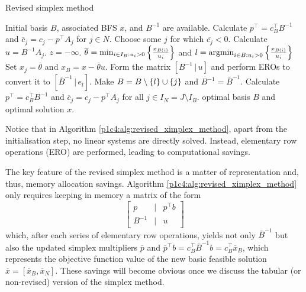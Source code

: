 \begin{algorithm}[h]
	\caption{Revised simplex method} \label{p1c4:alg:revised_ximplex_method}
	\begin{algorithmic}[1] %
	 Initial basis $B$, associated BFS $x$, and $B^{-1}$ are available.
	\State Calculate $p^\top = c_B^\top B^{-1}$ and $\overline{c}_j = c_j - p^\top A_j$ for $j \in N$.
	 \label{p1c4:alg:opt_condition_rev} 
	    \State Choose some $j$ for which $\overline{c_j} < 0$. Calculate $u = B^{-1}A_j$. 
	     \label{p1c4:alg:unb_condition_rev}
			 $z = -\infty$.		
		\Else
			\State $\overline{\theta} = \min_{i \in I_B : u_i > 0} \left\{ \frac{x_{B(i)}}{u_i} \right \}$ and $l = \mathop{\rm argmin}_{i \in B : u_i > 0} \left\{ \frac{x_{B(i)}}{u_i} \right \}$ 
			\State Set $x_j = \overline{\theta}$ and $x_B = x - \overline{\theta}u$.
			\State Form the matrix $[B^{-1} \,|\, u]$ and perform EROs to convert it to $[\overline{B}^{-1} \, | \, e_l]$. 
			\State Make $B = B \setminus \left\{ l \right \} \cup \left\{ j \right \}$ and $B^{-1} = \overline{B}^{-1}$. 
			\State Calculate $p^\top = c_B^\top B^{-1}$ and $\overline{c}_j = c_j - p^\top A_j$ for all $j \in I_N = J \setminus I_B$.
		\EndIf
	\EndWhile
	 optimal basis $B$ and optimal solution $x$.
	\end{algorithmic}
\end{algorithm}

Notice that in Algorithm \ref{p1c4:alg:revised_ximplex_method}, apart from the initialisation step, no linear systems are directly solved. Instead, elementary row operations (ERO) are performed, leading to computational savings.

The key feature of the revised simplex method is a matter of representation and, thus, memory allocation savings. Algorithm \ref{p1c4:alg:revised_ximplex_method} only requires keeping in memory a matrix of the form 
%
\begin{equation*}
	\begin{bmatrix}
		p & | & p^\top b \\
		B^{-1} & | & u	
	\end{bmatrix}
\end{equation*}
%  
which, after each series of elementary row operations, yields not only $\overline{B}^{-1}$ but also the updated simplex multipliers $\overline{p}$ and $\overline{p}^\top b = c_B^\top \overline{B}^{-1}b = c_B ^\top \overline{x}_B$, which represents the objective function value of the new basic feasible solution $\overline{x} = [\overline{x}_B, \overline{x}_N]$. These savings will become obvious once we discuss the tabular (or non-revised) version of the simplex method. 

